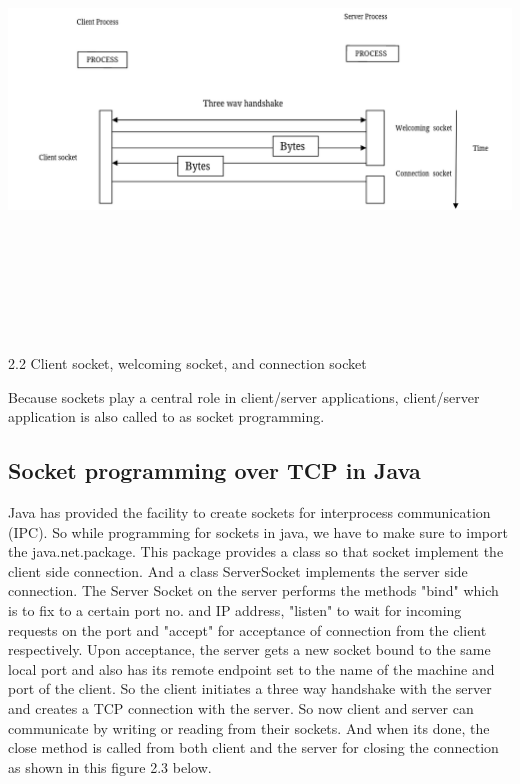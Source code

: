 \documentclass[12pt]{extarticle}
\begin{document}
\begin{center}

    \includegraphics[width=15cm, height=12cm]{client-welcoming-connection socket}
    
        2.2 Client socket, welcoming socket, and connection socket
    
\end{center}

Because sockets play a central role in client/server applications, client/server application is also
called to as socket programming.

\subsection{Socket programming over TCP in Java}

Java has provided the facility to create sockets for interprocess communication (IPC). So while 
programming for sockets in java, we have to make sure to import the java.net.package. This package 
provides a class so that socket implement the client side connection. And a class ServerSocket implements
the server side connection. The Server Socket on the server performs the methods "bind" which is to fix
to a certain port no. and IP address, "listen" to wait for incoming requests on the port and "accept"
for acceptance of connection from the client respectively. Upon acceptance, the server gets a 
new socket bound to the same local port and also has its remote endpoint 
set to the name of the  machine  and  port  of  the  client.  So the client  
initiates a three way handshake with the server and creates a TCP connection  
with the server. So now client and server can communicate by writing or reading from their sockets.
And when its done, the close method is called from both client and the server for closing the connection
as shown in this figure 2.3 below.
\end{document}
